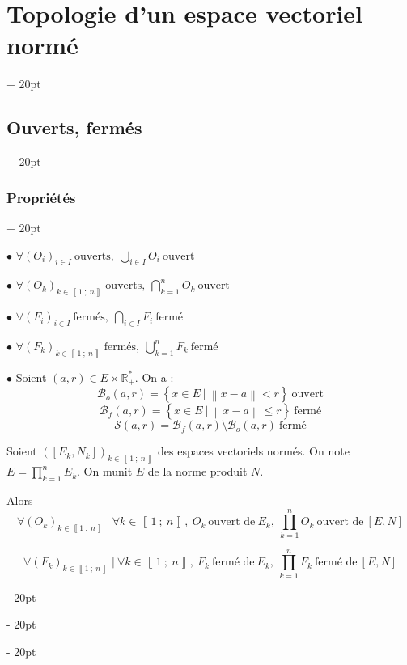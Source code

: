 \documentclass[a4paper, 12pt, twoside]{article}
\newcommand{\R}{\mathbb{R}} %
\newcommand{\nset}[2]{\left\llbracket #1\ ;\ #2 \right\rrbracket}
\newcommand{\lr}[1]{\left( #1 \right)}
\newcommand{\set}[1]{\left\{ #1 \right\}}
\newcommand{\norm}[1]{\left\lVert #1 \right\rVert}
\renewcommand{\le}{\leqslant}
\newcommand{\ind}[1][20pt]{\advance\leftskip + #1}
\newcommand{\deind}[1][20pt]{\advance\leftskip - #1}
\newenvironment{indt}[2][20pt]{#2 \par \ind[#1]}{\par \deind} %
\begin{document}
\begin{indt}{\section{Topologie d'un espace vectoriel normé}}
\begin{indt}{\subsection{Ouverts, fermés}}
\begin{indt}{\subsubsection{Propriétés}}
                \vspace{12pt}
                
                $\bullet$
                $
                    \displaystyle
                    \forall (O_i)_{i \in I}\ \text{ouverts},\
                    \bigcup_{i \in I} O_i\ \text{ouvert}
                $

                $\bullet$
                $
                    \displaystyle
                    \forall (O_k)_{k \in \nset 1 n}\ \text{ouverts},\
                    \bigcap_{k = 1}^n O_k\ \text{ouvert}
                $

                \vspace{6pt}
                
                $\bullet$
                $
                    \displaystyle
                    \forall (F_i)_{i \in I}\ \text{fermés},\
                    \bigcap_{i \in I} F_i\ \text{fermé}
                $

                $\bullet$
                $
                    \displaystyle
                    \forall (F_k)_{k \in \nset 1 n}\ \text{fermés},\
                    \bigcup_{k = 1}^n F_k\ \text{fermé}
                $

                \vspace{12pt}
                
                $\bullet$ Soient $(a, r) \in E \times \R^*_+$. On a :
                \[
                    \mathscr B_o(a, r) = \set{x \in E\ |\ \norm{x - a} < r}\ \text{ouvert}
                \]
                \[
                    \mathscr B_f(a, r) = \set{x \in E\ |\ \norm{x - a} \le r}\ \text{fermé}
                \]
                \[
                    \mathscr S(a, r) = \mathscr B_f(a, r) \setminus \mathscr B_o(a, r)\ \text{fermé}
                \]

                \vspace{12pt}
                
                Soient $\displaystyle \lr{[E_k, N_k]}_{k \in \nset 1 n}$ des espaces vectoriels normés.
                On note $E = \displaystyle \prod_{k = 1}^n E_k$.
                On munit $E$ de la norme produit $N$.

                Alors
                \[
                    \forall (O_k)_{k \in \nset 1 n}\ |\ \forall k \in \nset 1 n,\ O_k\ \text{ouvert de}\ E_k,\
                    \prod_{k = 1}^n O_k \ \text{ouvert de}\ [E, N]
                \]

                \[
                    \forall (F_k)_{k \in \nset 1 n}\ |\ \forall k \in \nset 1 n,\ F_k\ \text{fermé de}\ E_k,\
                    \prod_{k = 1}^n F_k \ \text{fermé de}\ [E, N]
                \]
            \end{indt}
        \end{indt}


\end{indt}
\end{document}

